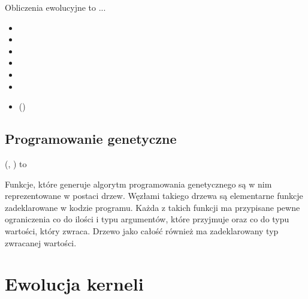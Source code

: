 Obliczenia ewolucyjne to ...

\begin{itemize}
\item {}
\item {}
\item {}
\item {}
\item {}
\item {}
\item {} ()
\end{itemize}

\subsection{Programowanie genetyczne}
 (, ) to 

Funkcje, które generuje algorytm programowania genetycznego są w nim reprezentowane w postaci drzew. Węzłami takiego drzewa są elementarne funkcje zadeklarowane w kodzie programu. Każda z takich funkcji ma przypisane pewne ograniczenia co do ilości i typu argumentów, które przyjmuje oraz co do typu wartości, który zwraca. Drzewo jako całość również ma zadeklarowany typ zwracanej wartości.

\section{Ewolucja kerneli}

\clearpage